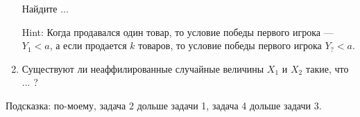 \documentclass[pdftex,12pt,a4paper]{article}
\begin{document}
\begin{enumerate}
Найдите ...

Hint: Когда продавался один товар, то условие победы первого игрока --- $ Y_{1}<a $, а если продается $ k $ товаров, то условие победы первого игрока $ Y_{?}<a $.



\item Существуют ли неаффилированные случайные величины $ X_{1} $ и $ X_{2} $ такие, что ... ?


\end{enumerate}


Подсказка: по-моему, задача 2 дольше задачи 1, задача 4 дольше задачи 3.



\printindex %
\end{document}
